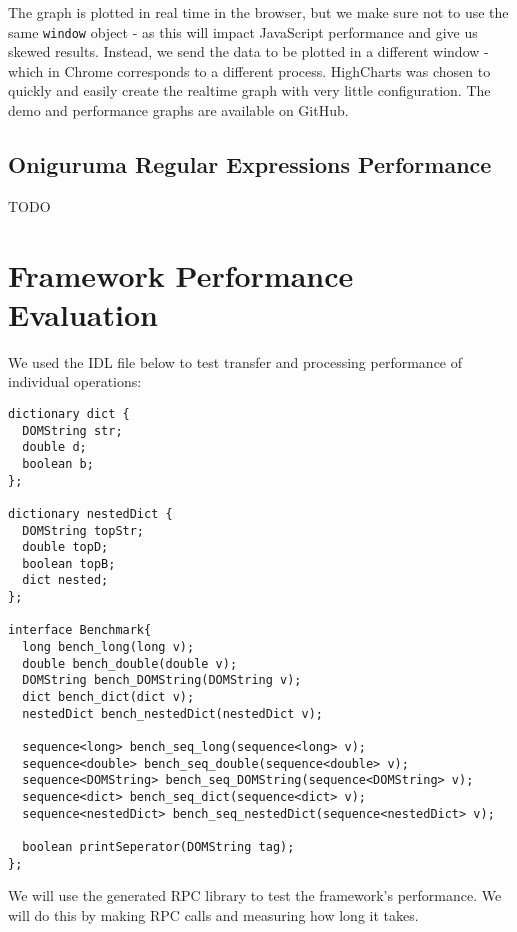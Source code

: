 The graph is plotted in real time in the browser, but we make sure not to use the same \lstinline{window} object - as this will impact JavaScript performance and give us skewed results. Instead, we send the data to be plotted in a different window - which in Chrome corresponds to a different process. HighCharts was chosen to quickly and easily create the realtime graph with very little configuration. The demo and performance graphs are available on GitHub.



\subsection{Oniguruma Regular Expressions Performance} %
\label{sub:oniguruma_regular_expressions_performance}
TODO

\section{Framework Performance Evaluation} %
\label{sec:performance_evaluation}
We used the IDL file below to test transfer and processing performance of individual operations:

\begin{verbatim}
dictionary dict {
  DOMString str;
  double d;
  boolean b;
};

dictionary nestedDict {
  DOMString topStr;
  double topD;
  boolean topB;
  dict nested;
};

interface Benchmark{
  long bench_long(long v);
  double bench_double(double v);
  DOMString bench_DOMString(DOMString v);
  dict bench_dict(dict v);
  nestedDict bench_nestedDict(nestedDict v);

  sequence<long> bench_seq_long(sequence<long> v);
  sequence<double> bench_seq_double(sequence<double> v);
  sequence<DOMString> bench_seq_DOMString(sequence<DOMString> v);
  sequence<dict> bench_seq_dict(sequence<dict> v);
  sequence<nestedDict> bench_seq_nestedDict(sequence<nestedDict> v);

  boolean printSeperator(DOMString tag);
};
\end{verbatim}

We will use the generated RPC library to test the framework's performance. We will do this by making RPC calls and measuring how long it takes.


